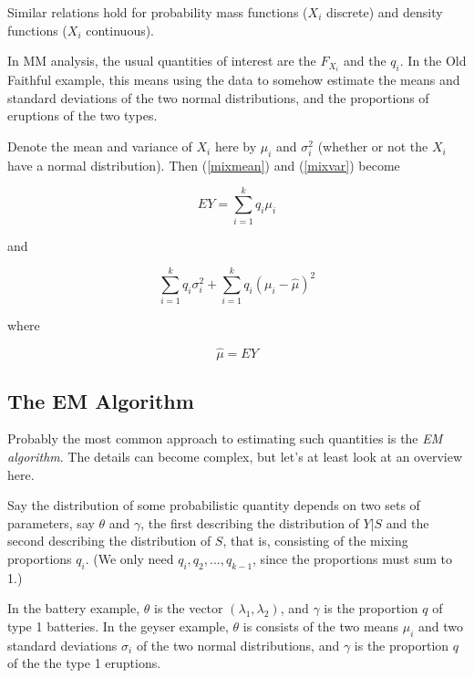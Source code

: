 \documentclass[11pt]{article}
\begin{document}
Similar relations hold for probability mass functions ($X_i$ discrete)
and density functions ($X_i$ continuous).

In MM analysis, the usual quantities of interest are the 
$F_{X_i}$ and the $q_i$.  In the Old Faithful example, this
means using the data to somehow estimate the means and
standard deviations of the two normal distributions, and the proportions
of eruptions of the two types.

Denote the mean and variance of $X_i$ here by $\mu_i$ and $\sigma_i^2$
(whether or not the $X_i$ have a normal distribution).  Then
(\ref{mixmean}) and (\ref{mixvar}) become

\begin{equation}
\label{MMexpmean}
EY = \sum_{i=1}^k q_i \mu_i
\end{equation}

and

\begin{equation}
\label{MMexpvar}
\sum_{i=1}^k q_i \sigma_i^2 +
\sum_{i=1}^k q_i (\mu_i - \hat{\mu})^2
\end{equation}

where

\begin{equation}
\hat{\mu} = EY
\end{equation}

\subsection{The EM Algorithm}
\label{emForMM}

Probably the most common approach to estimating such quantities is the
\textit{EM algorithm}.  The details can become complex, but let's at
least look at an overview here.  

Say the distribution of some probabilistic quantity depends on two sets
of parameters, say $\theta$ and $\gamma$, the first describing the
distribution of $Y|S$ and the second describing the distribution of $S$,
that is, consisting of the mixing proportions $q_i$.  (We only need
$q_i,q_2,...,q_{k-1}$, since the proportions must sum to 1.)

In the battery example, $\theta$ is the vector $(\lambda_1,\lambda_2)$,
and $\gamma$ is the proportion $q$ of type 1 batteries.  In the geyser
example, $\theta$ is consists of the two means $\mu_i$ and two standard
deviations $\sigma_i$ of the two normal distributions, and $\gamma$ is
the proportion $q$ of the the type 1 eruptions.  
\end{document}
